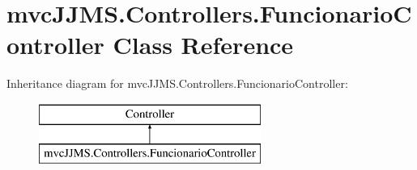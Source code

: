 \hypertarget{classmvc_j_j_m_s_1_1_controllers_1_1_funcionario_controller}{}\section{mvc\+J\+J\+M\+S.\+Controllers.\+Funcionario\+Controller Class Reference}
\label{classmvc_j_j_m_s_1_1_controllers_1_1_funcionario_controller}
Inheritance diagram for mvc\+J\+J\+M\+S.\+Controllers.\+Funcionario\+Controller\+:\begin{figure}[H]
\begin{center}
\leavevmode
\includegraphics[height=2.000000cm]{classmvc_j_j_m_s_1_1_controllers_1_1_funcionario_controller}
\end{center}
\end{figure}

